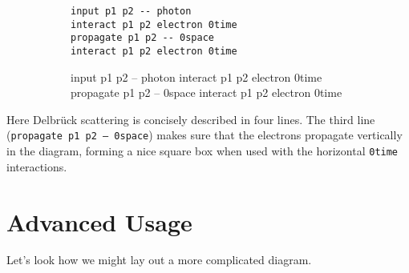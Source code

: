 \documentclass[12pt]{article}
\begin{document}
\begin{figure}[h!]\begin{subfigure}[h]{0.4\textwidth}\begin{center}
\begin{lstlisting}
input p1 p2 -- photon
interact p1 p2 electron 0time
propagate p1 p2 -- 0space
interact p1 p2 electron 0time
\end{lstlisting}
\end{center}\end{subfigure}\hfill\vrule\hfill\begin{subfigure}[h]{0.4\textwidth}\begin{center}
\begin{feynr}
input p1 p2 -- photon
interact p1 p2 electron 0time
propagate p1 p2 -- 0space
interact p1 p2 electron 0time
\end{feynr}
\end{center}\end{subfigure}\end{figure}
Here Delbr\"uck scattering is concisely described in four lines.
The third line (\texttt{propagate p1 p2 -- 0space}) makes sure that the electrons propagate vertically in the diagram, forming a nice square box when used with the horizontal \texttt{0time} interactions.

\newpage
\section*{Advanced Usage}
Let's look how we might lay out a more complicated diagram.
\end{document}

